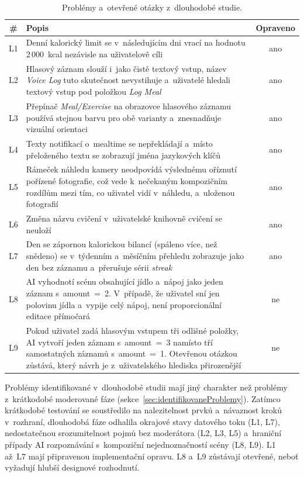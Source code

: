 \begin{table}[ht]
	\centering
	\caption{Problémy a~otevřené otázky z~dlouhodobé studie.}
	\label{tab:problemyDlouhodobe}
	\small
	\begin{tabularx}{\textwidth}{@{}c X c@{}}
		\toprule
		\textbf{\#} & \textbf{Popis} & \textbf{Opraveno} \\
		\midrule
		L1 & Denní kalorický limit se v~následujícím dni vrací na hodnotu 2\,000~kcal nezávisle na uživatelově cíli & ano \\
		L2 & Hlasový záznam slouží i~jako čistě textový vstup, název \emph{Voice Log} tuto skutečnost nevystihuje a~uživatelé hledali textový vstup pod položkou \emph{Log Meal} & ano \\
		L3 & Přepínač \emph{Meal/Exercise} na obrazovce hlasového záznamu používá stejnou barvu pro obě varianty a~znesnadňuje vizuální orientaci & ano \\
		L4 & Texty notifikací o~mealtime se nepřekládají a~místo přeloženého textu se zobrazují jména jazykových klíčů & ano \\
		L5 & Rámeček náhledu kamery neodpovídá výslednému oříznutí pořízené fotografie, což vede k~nečekaným kompozičním rozdílům mezi tím, co uživatel vidí v~náhledu, a~uloženou fotografií & ano \\
		L6 & Změna názvu cvičení v~uživatelské knihovně cvičení se neuloží & ano \\
		L7 & Den se zápornou kalorickou bilancí (spáleno více, než snědeno) se v~týdenním a~měsíčním přehledu zobrazuje jako den bez záznamu a~přerušuje sérii \emph{streak} & ano \\
		L8 & AI vyhodnotí scénu obsahující jídlo a~nápoj jako jeden záznam s~amount~=~2. V~případě, že uživatel sní jen polovinu jídla a~vypije celý nápoj, není proporcionální editace přímočará & ne \\
		L9 & Pokud uživatel zadá hlasovým vstupem tři odlišné položky, AI vytvoří jeden záznam s~amount~=~3 namísto tří samostatných záznamů s~amount~=~1. Otevřenou otázkou zůstává, který návrh je z~uživatelského hlediska přirozenější & ne \\
		\bottomrule
	\end{tabularx}
\end{table}

Problémy identifikované v~dlouhodobé studii mají jiný charakter než problémy z~krátkodobé moderované fáze (sekce~\ref{sec:identifikovaneProblemy}).
Zatímco krátkodobé testování se soustředilo na nalezitelnost prvků a~návaznost kroků v~rozhraní, dlouhodobá fáze odhalila okrajové stavy datového toku (L1, L7), nedostatečnou srozumitelnost pojmů bez moderátora (L2, L3, L5) a~hraniční případy AI rozpoznávání s~kompoziční nejednoznačností scény (L8, L9).
L1 až~L7 mají připravenou implementační opravu. L8 a~L9 zůstávají otevřené, neboť vyžadují hlubší designové rozhodnutí.

